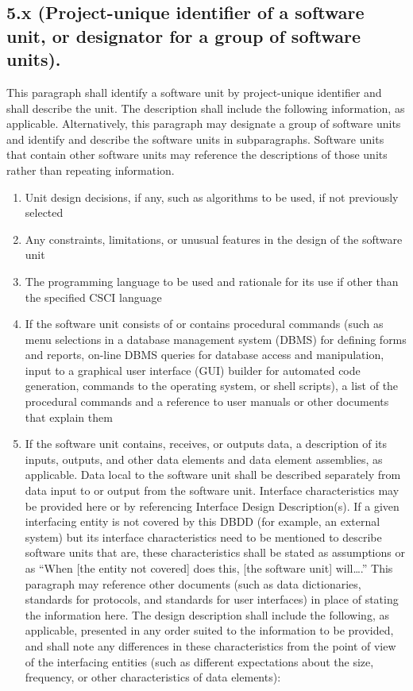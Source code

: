 \subsection{5.x (Project-unique identifier of a software unit, or
designator for a group of software units).}

This paragraph shall identify a software unit by project-unique
identifier and shall describe the unit. The description shall include
the following information, as applicable. Alternatively, this paragraph
may designate a group of software units and identify and describe the
software units in subparagraphs. Software units that contain other
software units may reference the descriptions of those units rather than
repeating information.

\begin{enumerate}
\itemsep1pt\parskip0pt
\item
  Unit design decisions, if any, such as algorithms to be used, if not
  previously selected
\item
  Any constraints, limitations, or unusual features in the design of the
  software unit
\item
  The programming language to be used and rationale for its use if other
  than the specified CSCI language
\item
  If the software unit consists of or contains procedural commands (such
  as menu selections in a database management system (DBMS) for defining
  forms and reports, on-line DBMS queries for database access and
  manipulation, input to a graphical user interface (GUI) builder for
  automated code generation, commands to the operating system, or shell
  scripts), a list of the procedural commands and a reference to user
  manuals or other documents that explain them
\item
  If the software unit contains, receives, or outputs data, a
  description of its inputs, outputs, and other data elements and data
  element assemblies, as applicable. Data local to the software unit
  shall be described separately from data input to or output from the
  software unit. Interface characteristics may be provided here or by
  referencing Interface Design Description(s). If a given interfacing
  entity is not covered by this DBDD (for example, an external system)
  but its interface characteristics need to be mentioned to describe
  software units that are, these characteristics shall be stated as
  assumptions or as ``When {[}the entity not covered{]} does this,
  {[}the software unit{]} will\ldots{}.'' This paragraph may reference
  other documents (such as data dictionaries, standards for protocols,
  and standards for user interfaces) in place of stating the information
  here. The design description shall include the following, as
  applicable, presented in any order suited to the information to be
  provided, and shall note any differences in these characteristics from
  the point of view of the interfacing entities (such as different
  expectations about the size, frequency, or other characteristics of
  data elements):


\end{enumerate}
